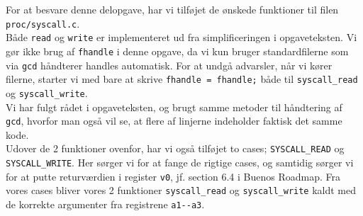 %
%

For at besvare denne delopgave, har vi tilføjet de ønskede funktioner til filen \verb+proc/syscall.c+. \\

\noindent Både \verb+read+ og \verb+write+ er implementeret ud fra simplificeringen i opgaveteksten. Vi 
gør ikke brug af \verb+fhandle+ i denne opgave, da vi kun bruger standardfilerne som via \verb+gcd+ 
håndterer handles automatisk. For at undgå advarsler, når vi kører filerne, starter vi med bare at skrive 
\verb+fhandle = fhandle;+ både til \verb+syscall_read+ og \verb+syscall_write+.\\

\noindent Vi har fulgt rådet i opgaveteksten, og brugt samme metoder til håndtering af \verb+gcd+, hvorfor 
man også vil se, at flere af linjerne indeholder faktisk det samme kode. \\

\noindent Udover de 2 funktioner ovenfor, har vi også tilføjet to cases; \verb+SYSCALL_READ+ og 
\verb+SYSCALL_WRITE+. Her sørger vi for at fange de rigtige cases, og samtidig sørger vi for at putte 
returværdien i register \verb+v0+, jf. section 6.4 i Buenos Roadmap. Fra vores cases bliver vores 2 
funktioner \verb+syscall_read+ og \verb+syscall_write+ kaldt med de korrekte argumenter fra registrene
\verb+a1--a3+.
